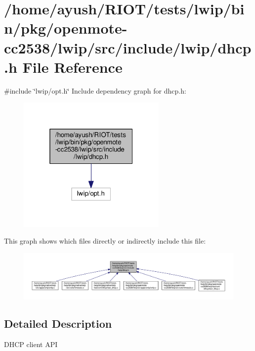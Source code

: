 \hypertarget{openmote-cc2538_2lwip_2src_2include_2lwip_2dhcp_8h}{}\section{/home/ayush/\+R\+I\+O\+T/tests/lwip/bin/pkg/openmote-\/cc2538/lwip/src/include/lwip/dhcp.h File Reference}
\label{openmote-cc2538_2lwip_2src_2include_2lwip_2dhcp_8h}
{\ttfamily \#include \char`\"{}lwip/opt.\+h\char`\"{}}\newline
Include dependency graph for dhcp.\+h\+:
\nopagebreak
\begin{figure}[H]
\begin{center}
\leavevmode
\includegraphics[width=205pt]{openmote-cc2538_2lwip_2src_2include_2lwip_2dhcp_8h__incl}
\end{center}
\end{figure}
This graph shows which files directly or indirectly include this file\+:
\nopagebreak
\begin{figure}[H]
\begin{center}
\leavevmode
\includegraphics[width=350pt]{openmote-cc2538_2lwip_2src_2include_2lwip_2dhcp_8h__dep__incl}
\end{center}
\end{figure}


\subsection{Detailed Description}
D\+H\+CP client A\+PI 